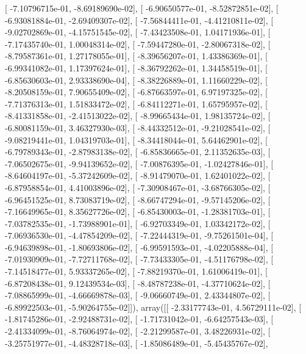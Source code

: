 \documentclass{article}
\begin{document}
       [ -7.10796715e-01,  -8.69189690e-02],
       [ -6.90650577e-01,  -8.52872851e-02],
       [ -6.93081884e-01,  -2.69409307e-02],
       [ -7.56844411e-01,  -4.41210811e-02],
       [ -9.02702869e-01,  -4.15751545e-02],
       [ -7.43423508e-01,   1.04171936e-01],
       [ -7.17435740e-01,   1.00048314e-02],
       [ -7.59447280e-01,  -2.80067318e-02],
       [ -8.79587361e-01,   1.27178055e-01],
       [ -8.39656207e-01,   1.43386369e-01],
       [ -6.99341082e-01,   1.17397624e-01],
       [ -8.36792262e-01,   1.34458519e-01],
       [ -6.85630603e-01,   2.93338690e-04],
       [ -8.38226889e-01,   1.11660229e-02],
       [ -8.20508159e-01,   7.90655409e-02],
       [ -6.87663597e-01,   6.97197325e-02],
       [ -7.71376313e-01,   1.51833472e-02],
       [ -6.84112271e-01,   1.65795957e-02],
       [ -8.41331858e-01,  -2.41513022e-02],
       [ -8.99665434e-01,   1.98135724e-02],
       [ -6.80081159e-01,   3.46327930e-03],
       [ -8.44332512e-01,  -9.21028541e-02],
       [ -9.08219441e-01,   1.04319703e-01],
       [ -8.34418044e-01,   5.64462901e-02],
       [ -6.79789343e-01,  -2.87983138e-02],
       [ -6.85836665e-01,   2.11352635e-03],
       [ -7.06502675e-01,  -9.94139652e-02],
       [ -7.00876395e-01,  -1.02427846e-01],
       [ -8.64604197e-01,  -5.37242609e-02],
       [ -8.91479070e-01,   1.62401022e-02],
       [ -6.87958854e-01,   4.41003896e-02],
       [ -7.30908467e-01,  -3.68766305e-02],
       [ -6.96451525e-01,   8.73083719e-02],
       [ -8.66747294e-01,  -9.57145206e-02],
       [ -7.16649965e-01,   8.35627726e-02],
       [ -6.85430003e-01,  -1.28381703e-01],
       [ -7.03782535e-01,  -1.73988901e-01],
       [ -6.92703349e-01,   1.03342172e-02],
       [ -7.06936530e-01,  -4.47854209e-02],
       [ -7.22444319e-01,  -9.75261501e-04],
       [ -6.94639898e-01,  -1.80693806e-02],
       [ -6.99591593e-01,  -4.02205888e-04],
       [ -7.01930909e-01,  -7.72711768e-02],
       [ -7.73433305e-01,  -4.51176798e-02],
       [ -7.14518477e-01,   5.93337265e-02],
       [ -7.88219370e-01,   1.61006419e-01],
       [ -6.87208438e-01,   9.12439534e-03],
       [ -8.48787238e-01,  -4.37710624e-02],
       [ -7.08865999e-01,  -4.66669878e-03],
       [ -9.06660749e-01,   2.43344807e-02],
       [ -6.89922503e-01,  -5.90264755e-02]]), array([[ -2.33177743e-01,   4.56729111e-02],
       [ -1.81745286e-01,  -2.92488731e-02],
       [ -1.71731042e-01,  -6.64257543e-03],
       [ -2.41334099e-01,  -8.76064974e-02],
       [ -2.21299587e-01,   3.48226931e-02],
       [ -3.25751977e-01,  -4.48328718e-03],
       [ -1.85086489e-01,  -5.45435767e-02],
\end{document}
